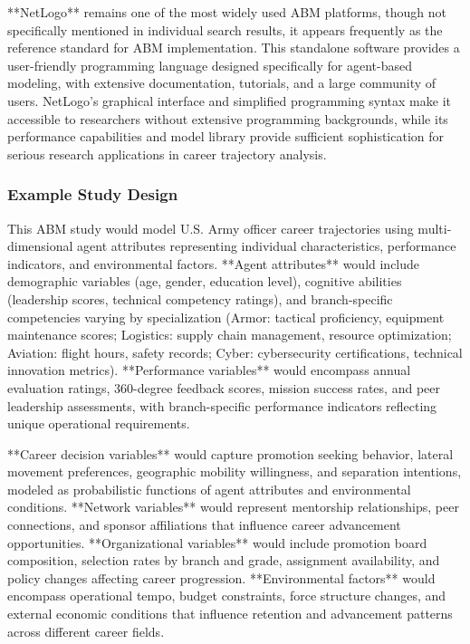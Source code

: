 \documentclass[main.tex]{subfiles}
\begin{document}
**NetLogo** remains one of the most widely used ABM platforms, though not specifically mentioned in individual search results, it appears frequently as the reference standard for ABM implementation\parencite{railsback_grimm,graduate_attrition}. This standalone software provides a user-friendly programming language designed specifically for agent-based modeling, with extensive documentation, tutorials, and a large community of users. NetLogo's graphical interface and simplified programming syntax make it accessible to researchers without extensive programming backgrounds, while its performance capabilities and model library provide sufficient sophistication for serious research applications in career trajectory analysis.

\subsubsection{Example Study Design}


This ABM study would model U.S. Army officer career trajectories using multi-dimensional agent attributes representing individual characteristics, performance indicators, and environmental factors. **Agent attributes** would include demographic variables (age, gender, education level), cognitive abilities (leadership scores, technical competency ratings), and branch-specific competencies varying by specialization (Armor: tactical proficiency, equipment maintenance scores; Logistics: supply chain management, resource optimization; Aviation: flight hours, safety records; Cyber: cybersecurity certifications, technical innovation metrics). **Performance variables** would encompass annual evaluation ratings, 360-degree feedback scores, mission success rates, and peer leadership assessments, with branch-specific performance indicators reflecting unique operational requirements.

**Career decision variables** would capture promotion seeking behavior, lateral movement preferences, geographic mobility willingness, and separation intentions, modeled as probabilistic functions of agent attributes and environmental conditions. **Network variables** would represent mentorship relationships, peer connections, and sponsor affiliations that influence career advancement opportunities. **Organizational variables** would include promotion board composition, selection rates by branch and grade, assignment availability, and policy changes affecting career progression. **Environmental factors** would encompass operational tempo, budget constraints, force structure changes, and external economic conditions that influence retention and advancement patterns across different career fields.
\end{document}
